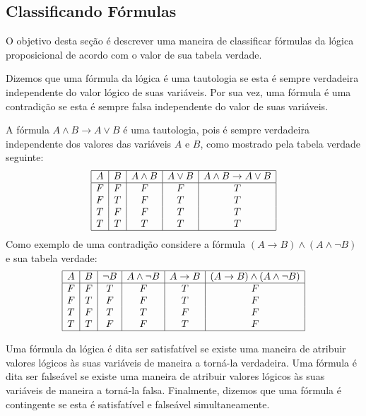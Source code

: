 \subsection{Classificando F\'ormulas}

O objetivo desta se\c{c}\~ao \'e descrever uma maneira de classificar
f\'ormulas da l\'ogica proposicional de acordo com o valor de sua
tabela verdade.

\begin{Definition}
Dizemos que uma f\'ormula da l\'ogica \'e uma tautologia se esta \'e
sempre verdadeira independente do valor l\'ogico de suas
vari\'aveis. Por sua vez, uma f\'ormula \'e uma contradi\c{c}\~ao se
esta \'e sempre falsa independente do valor de suas vari\'aveis.
\end{Definition}
\begin{Example}
A f\'ormula $A\land B\to A \lor B$ \'e uma tautologia, pois \'e sempre
verdadeira independente dos valores das vari\'aveis $A$ e $B$, como
mostrado pela tabela verdade seguinte:
\[
\begin{array}{|c|c|c|c|c|}
\hline
A & B & A \land B & A \lor B & A \land B \to A \lor B \\ \hline
F & F & F & F & T \\
F & T & F & T & T \\
T & F & F & T & T \\
T & T & T & T & T \\ \hline
\end{array}
\]
Como exemplo de uma contradi\c{c}\~ao considere a f\'ormula
$(A\to B) \land (A \land \neg B)$ e sua tabela verdade:
\[
\begin{array}{|c|c|c|c|c|c|}
  \hline
  A & B & \neg B & A \land \neg B & A \to B & (A \to B) \land (A \land
  \neg B) \\ \hline
  F & F & T & F & T & F \\
  F & T & F & F & T & F \\
  T & F & T & T & F & F \\
  T & T & F & F & T & F \\ \hline
\end{array}
\]
\end{Example}
\begin{Definition}
  Uma f\'ormula da l\'ogica \'e dita ser satisfat\'ivel se existe uma
  maneira de atribuir valores l\'ogicos \`as suas vari\'aveis de
  maneira a torn\'a-la verdadeira. Uma f\'ormula \'e dita ser
  false\'avel se existe uma maneira de atribuir valores l\'ogicos \`as
  suas vari\'aveis de maneira a torn\'a-la falsa. Finalmente, dizemos
  que uma f\'ormula \'e contingente se esta \'e satisfat\'ivel e
  false\'avel simultaneamente.
\end{Definition}
